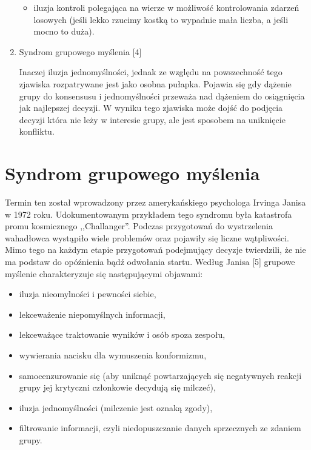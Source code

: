 \begin{enumerate}
\begin{itemize}
    \item iluzja kontroli polegająca na wierze w możliwość kontrolowania zdarzeń
    losowych (jeśli lekko rzucimy kostką to wypadnie mała liczba, a jeśli mocno
    to duża).
  \end{itemize}
  
  \item Syndrom grupowego myślenia [4]
  
  Inaczej iluzja jednomyślności, jednak ze względu na powszechność tego zjawiska
  rozpatrywane jest jako osobna pułapka. Pojawia się gdy dążenie grupy do 
  konsensusu i jednomyślności przeważa nad dążeniem do osiągnięcia jak 
  najlepszej decyzji. W wyniku tego zjawiska może dojść do podjęcia decyzji 
  która nie leży w interesie grupy, ale jest sposobem na uniknięcie konfliktu.

\end{enumerate}

\section{Syndrom grupowego myślenia}
Termin ten został wprowadzony przez amerykańskiego psychologa Irvinga Janisa w
1972 roku. Udokumentowanym przykładem tego syndromu była katastrofa promu
kosmicznego ,,Challanger''. Podczas przygotowań do wystrzelenia wahadłowca
wystąpiło wiele problemów oraz pojawiły się liczne wątpliwości. Mimo tego na
każdym  etapie przygotowań podejmujący decyzje twierdzili, że nie ma podstaw do 
opóźnienia bądź odwołania startu.
Według Janisa [5] grupowe myślenie charakteryzuje się następującymi objawami:

\begin{itemize}
  \item iluzja nieomylności i pewności siebie,
  \item lekceważenie niepomyślnych informacji,
  \item lekceważące traktowanie wyników i osób spoza zespołu,
  \item wywierania nacisku dla wymuszenia konformizmu,
  \item samocenzurowanie się (aby uniknąć powtarzających się negatywnych reakcji
  grupy jej krytyczni członkowie decydują się milczeć),
  \item iluzja jednomyślności (milczenie jest oznaką zgody),
  \item filtrowanie informacji, czyli niedopuszczanie danych sprzecznych ze
  zdaniem grupy.
\end{itemize}

